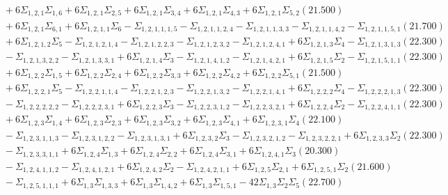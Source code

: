 \documentclass[12pt]{article}
\begin{document}
\begin{landscape}
\begin{align*}
		&\quad\quad +6\Sigma_{1,2,1}\Sigma_{1,6}+6\Sigma_{1,2,1}\Sigma_{2,5}+6\Sigma_{1,2,1}\Sigma_{3,4}+6\Sigma_{1,2,1}\Sigma_{4,3}+6\Sigma_{1,2,1}\Sigma_{5,2}(21.500) \\ 
		&\quad\quad +6\Sigma_{1,2,1}\Sigma_{6,1}+6\Sigma_{1,2,1,1}\Sigma_{6}-\Sigma_{1,2,1,1,1,5}-\Sigma_{1,2,1,1,2,4}-\Sigma_{1,2,1,1,3,3}-\Sigma_{1,2,1,1,4,2}-\Sigma_{1,2,1,1,5,1}(21.700) \\ 
		&\quad\quad +6\Sigma_{1,2,1,2}\Sigma_{5}-\Sigma_{1,2,1,2,1,4}-\Sigma_{1,2,1,2,2,3}-\Sigma_{1,2,1,2,3,2}-\Sigma_{1,2,1,2,4,1}+6\Sigma_{1,2,1,3}\Sigma_{4}-\Sigma_{1,2,1,3,1,3}(22.300) \\ 
		&\quad\quad -\Sigma_{1,2,1,3,2,2}-\Sigma_{1,2,1,3,3,1}+6\Sigma_{1,2,1,4}\Sigma_{3}-\Sigma_{1,2,1,4,1,2}-\Sigma_{1,2,1,4,2,1}+6\Sigma_{1,2,1,5}\Sigma_{2}-\Sigma_{1,2,1,5,1,1}(22.300) \\ 
		&\quad\quad +6\Sigma_{1,2,2}\Sigma_{1,5}+6\Sigma_{1,2,2}\Sigma_{2,4}+6\Sigma_{1,2,2}\Sigma_{3,3}+6\Sigma_{1,2,2}\Sigma_{4,2}+6\Sigma_{1,2,2}\Sigma_{5,1}(21.500) \\ 
		&\quad\quad +6\Sigma_{1,2,2,1}\Sigma_{5}-\Sigma_{1,2,2,1,1,4}-\Sigma_{1,2,2,1,2,3}-\Sigma_{1,2,2,1,3,2}-\Sigma_{1,2,2,1,4,1}+6\Sigma_{1,2,2,2}\Sigma_{4}-\Sigma_{1,2,2,2,1,3}(22.300) \\ 
		&\quad\quad -\Sigma_{1,2,2,2,2,2}-\Sigma_{1,2,2,2,3,1}+6\Sigma_{1,2,2,3}\Sigma_{3}-\Sigma_{1,2,2,3,1,2}-\Sigma_{1,2,2,3,2,1}+6\Sigma_{1,2,2,4}\Sigma_{2}-\Sigma_{1,2,2,4,1,1}(22.300) \\ 
		&\quad\quad +6\Sigma_{1,2,3}\Sigma_{1,4}+6\Sigma_{1,2,3}\Sigma_{2,3}+6\Sigma_{1,2,3}\Sigma_{3,2}+6\Sigma_{1,2,3}\Sigma_{4,1}+6\Sigma_{1,2,3,1}\Sigma_{4}(22.100) \\ 
		&\quad\quad -\Sigma_{1,2,3,1,1,3}-\Sigma_{1,2,3,1,2,2}-\Sigma_{1,2,3,1,3,1}+6\Sigma_{1,2,3,2}\Sigma_{3}-\Sigma_{1,2,3,2,1,2}-\Sigma_{1,2,3,2,2,1}+6\Sigma_{1,2,3,3}\Sigma_{2}(22.300) \\ 
		&\quad\quad -\Sigma_{1,2,3,3,1,1}+6\Sigma_{1,2,4}\Sigma_{1,3}+6\Sigma_{1,2,4}\Sigma_{2,2}+6\Sigma_{1,2,4}\Sigma_{3,1}+6\Sigma_{1,2,4,1}\Sigma_{3}(20.300) \\ 
		&\quad\quad -\Sigma_{1,2,4,1,1,2}-\Sigma_{1,2,4,1,2,1}+6\Sigma_{1,2,4,2}\Sigma_{2}-\Sigma_{1,2,4,2,1,1}+6\Sigma_{1,2,5}\Sigma_{2,1}+6\Sigma_{1,2,5,1}\Sigma_{2}(21.600) \\ 
		&\quad\quad -\Sigma_{1,2,5,1,1,1}+6\Sigma_{1,3}\Sigma_{1,3,3}+6\Sigma_{1,3}\Sigma_{1,4,2}+6\Sigma_{1,3}\Sigma_{1,5,1}-42\Sigma_{1,3}\Sigma_{2}\Sigma_{5}(22.700) \\ 

\end{align*}
\end{landscape}
\end{document}
